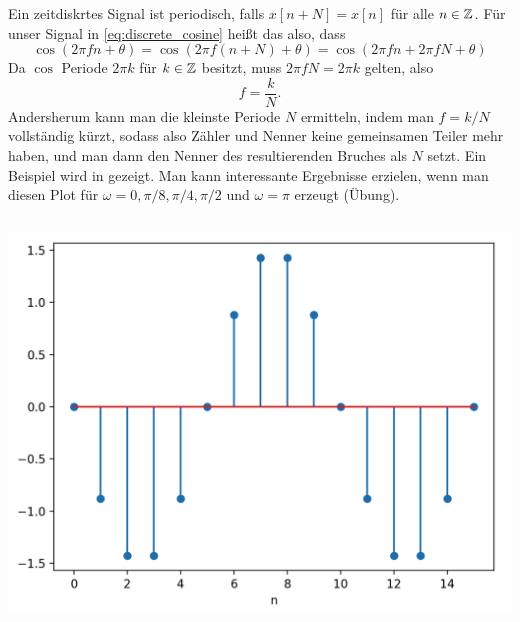 Ein zeitdiskrtes Signal ist periodisch, falls $x[n + N] = x[n]$ für alle $n \in \mathbb{Z}$.
Für unser Signal in \eqref{eq:discrete_cosine} heißt das also, dass
\[
    \cos(2 \pi f n + \theta) 
        = \cos(2 \pi f (n + N) + \theta)
        = \cos(2 \pi f n + 2 \pi f N + \theta)
\]
Da $\cos$ Periode $2\pi k$ für $k \in \mathbb{Z}$ besitzt, muss $2 \pi f N = 2 \pi k$ gelten, also
\[
    f = \frac kN.
\]
Andersherum kann man die kleinste Periode $N$ ermitteln, indem man $f = k/N$ vollständig kürzt, sodass also Zähler und Nenner keine gemeinsamen Teiler mehr haben, und man dann den Nenner des resultierenden Bruches als $N$ setzt. 
Ein Beispiel wird in  gezeigt. 
Man kann interessante Ergebnisse erzielen, wenn man diesen Plot für $\omega=0,\pi/8,\pi/4,\pi/2$ und $\omega=\pi$ erzeugt (Übung).
%
\begin{listing}
    \noindent
    \begin{minipage}{0.49\textwidth}
        \strut\vspace*{-\baselineskip}\newline
        \inputminted[firstline=4]{python3}{code/disc_harms.py}
    \end{minipage}%
    \begin{minipage}{0.49\textwidth}
        \strut\vspace*{-\baselineskip}\newline
        \includegraphics[width=\textwidth]{code/disc_harms.png}
    \end{minipage}
    \label{py:disc_harms}
\end{listing}

